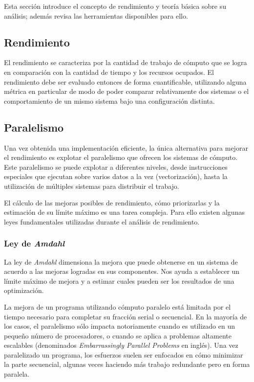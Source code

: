 \documentclass[a4paper]{report}
\begin{document}
Esta sección introduce el concepto de rendimiento y teoría básica sobre su análisis; además revisa las herramientas disponibles para ello.

\subsection{Rendimiento}

El rendimiento se caracteriza por la cantidad de trabajo de cómputo que se logra en comparación con la cantidad de tiempo y los recursos ocupados.
El rendimiento debe ser evaluado entonces de forma cuantificable, utilizando alguna métrica en particular de modo de poder comparar relativamente dos sistemas o
el comportamiento de un mismo sistema bajo una configuración distinta.

\subsection{Paralelismo}

Una vez obtenida una implementación eficiente, la única alternativa para mejorar el rendimiento es explotar el paralelismo que ofrecen los sistemas de cómputo.
Este paralelismo se puede explotar a diferentes niveles, desde instrucciones especiales que ejecutan sobre varios datos a la vez (vectorización),
hasta la utilización de múltiples sistemas para distribuir el trabajo.

\bigskip

El cálculo de las mejoras posibles de rendimiento, cómo priorizarlas y la estimación de su límite máximo es una tarea compleja. 
Para ello existen algunas leyes fundamentales utilizadas durante el análisis de rendimiento.

\subsubsection{Ley de {\it Amdahl}}

 La ley de {\it Amdahl} \cite{amdahl} dimensiona la mejora que puede obtenerse en un sistema de acuerdo a las mejoras logradas en sus componentes. 
Nos ayuda a establecer un límite máximo de mejora y a estimar cuales pueden ser los resultados de una optimización.

\bigskip

La mejora de un programa utilizando cómputo paralelo está limitada por el tiempo necesario para completar su fracción serial o secuencial. En la mayoría de los casos, el paralelismo sólo impacta notoriamente cuando es utilizado en un pequeño número de procesadores, o cuando se aplica a problemas altamente escalables (denominados {\it Embarrassingly Parallel Problems} en inglés). Una vez paralelizado un programa, los esfuerzos suelen ser enfocados en cómo minimizar la parte secuencial, algunas veces haciendo más trabajo redundante pero en forma paralela.
\end{document}
